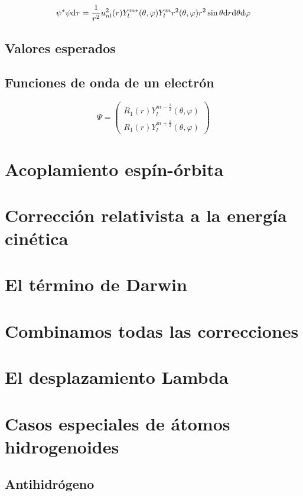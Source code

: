 \begin{equation}
    \psi^* \psi \mathrm{d} \tau = \frac{1}{r^2} u_{nl}^2 (r) Y_l^{m*} (\theta , \varphi)  Y_l^m r^2 (\theta , \varphi) r^2 \sin \theta \mathrm{d} r \mathrm{d} \theta \mathrm{d} \varphi
\end{equation}


\subsection{Valores esperados}

\subsection{Funciones de onda de un electrón}

\begin{equation}
    \Psi = \begin{pmatrix}
    R_1 (r) Y_l^{m-\frac{1}{2}} (\theta,\varphi) \\
    R_1 (r) Y_l^{m+\frac{1}{2}} (\theta,\varphi) 
    \end{pmatrix}
\end{equation}


\section{Acoplamiento espín-órbita}


 
\section{Corrección relativista a la energía cinética}

\section{El término de Darwin}

\section{Combinamos todas las correcciones}

\section{El desplazamiento Lambda}

\section{Casos especiales de átomos hidrogenoides}

\subsection{Antihidrógeno}
